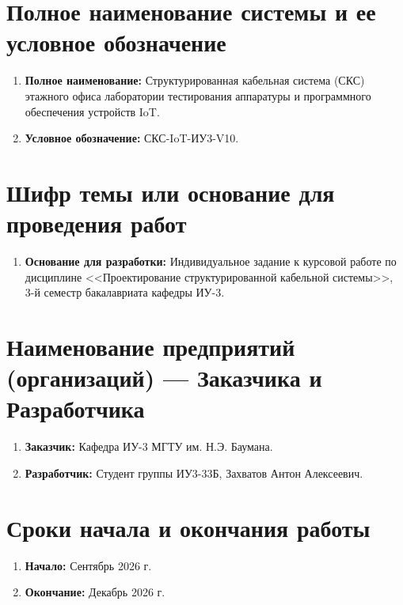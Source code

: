 \documentclass[a4paper,oneside,14pt]{extreport}
\begin{document}
\begin{appendices}
\newpage


\section{Полное наименование системы и ее условное обозначение}
\begin{enumerate}[label=\arabic{section}.\arabic*]
    \item \textbf{Полное наименование:} Структурированная кабельная система (СКС) этажного офиса лаборатории тестирования аппаратуры и программного обеспечения устройств IoT.
    \item \textbf{Условное обозначение:} СКС-IoT-ИУ3-V10.
\end{enumerate}

\section{Шифр темы или основание для проведения работ}
\begin{enumerate}[label=\arabic{section}.\arabic*]
    \item \textbf{Основание для разработки:} Индивидуальное задание к курсовой работе по дисциплине <<Проектирование структурированной кабельной системы>>, 3-й семестр бакалавриата кафедры ИУ-3.
\end{enumerate}

\section{Наименование предприятий (организаций) --- Заказчика и Разработчика}
\begin{enumerate}[label=\arabic{section}.\arabic*]
    \item \textbf{Заказчик:} Кафедра ИУ-3 МГТУ им. Н.Э. Баумана.
    \item \textbf{Разработчик:} Студент группы ИУ3-33Б, Захватов Антон Алексеевич.
\end{enumerate}

\section{Сроки начала и окончания работы}
\begin{enumerate}[label=\arabic{section}.\arabic*]
    \item \textbf{Начало:} Сентябрь 2026 г.
    \item \textbf{Окончание:} Декабрь 2026 г.
\end{enumerate}


\end{appendices}
\end{document}
